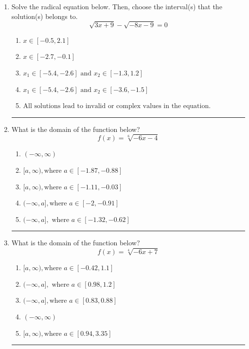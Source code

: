 \documentclass[14pt]{extbook}
\newcommand{\litem}[1]{\item#1\hspace*{-1cm}\rule{\textwidth}{0.4pt}}
\begin{document}
\begin{enumerate}
{\begin{enumerate}[label=\Alph*.]
\end{enumerate} }
\litem{
Solve the radical equation below. Then, choose the interval(s) that the solution(s) belongs to.\[ \sqrt{3 x + 9} - \sqrt{-8 x - 9} = 0 \]\begin{enumerate}[label=\Alph*.]
\item \( x \in [-0.5,2.1] \)
\item \( x \in [-2.7,-0.1] \)
\item \( x_1 \in [-5.4, -2.6] \text{ and } x_2 \in [-1.3,1.2] \)
\item \( x_1 \in [-5.4, -2.6] \text{ and } x_2 \in [-3.6,-1.5] \)
\item \( \text{All solutions lead to invalid or complex values in the equation.} \)

\end{enumerate} }
\litem{
What is the domain of the function below?\[ f(x) = \sqrt[6]{-6 x - 4} \]\begin{enumerate}[label=\Alph*.]
\item \( (-\infty, \infty) \)
\item \( [a, \infty), \text{where } a \in [-1.87, -0.88] \)
\item \( [a, \infty), \text{where } a \in [-1.11, -0.03] \)
\item \( (-\infty, a], \text{where } a \in [-2, -0.91] \)
\item \( (-\infty, a], \text{ where } a \in [-1.32, -0.62] \)

\end{enumerate} }
\litem{
What is the domain of the function below?\[ f(x) = \sqrt[4]{-6 x + 7} \]\begin{enumerate}[label=\Alph*.]
\item \( [a, \infty), \text{where } a \in [-0.42, 1.1] \)
\item \( (-\infty, a], \text{ where } a \in [0.98, 1.2] \)
\item \( (-\infty, a], \text{where } a \in [0.83, 0.88] \)
\item \( (-\infty, \infty) \)
\item \( [a, \infty), \text{where } a \in [0.94, 3.35] \)

\end{enumerate} }
\end{enumerate}
\end{document}
